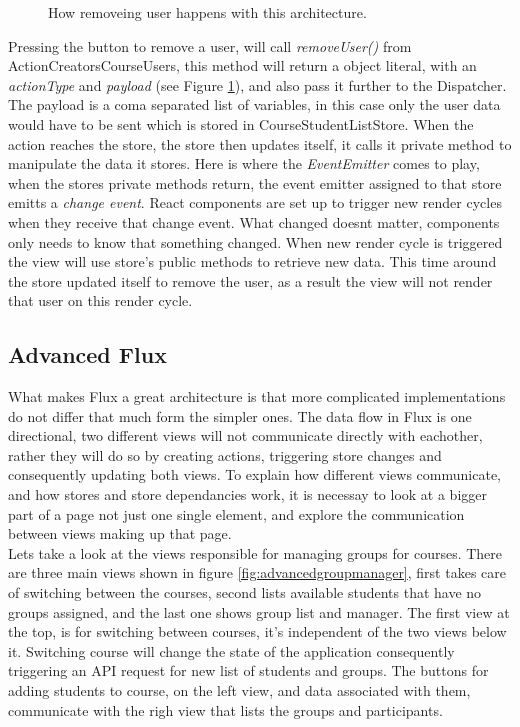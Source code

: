 \begin{figure}[h]
  \scalebox{0.8}{}
  \caption{How removeing user happens with this architecture.}
  \label{fig:simplefluxremoveuser}
\end{figure}

Pressing the button to remove a user, will call \emph{removeUser()} from ActionCreatorsCourseUsers, this method will return a object literal, with an \emph{actionType} and \emph{payload} (see Figure \ref{fig:simplefluxremoveuser}), and also pass it further to the Dispatcher. The payload is a coma separated list of variables, in this case only the user data would have to be sent which is stored in CourseStudentListStore. When the action reaches the store, the store then updates itself, it calls it private method to manipulate the data it stores. Here is where the \emph{EventEmitter} comes to play, when the stores private methods return, the event emitter assigned to that store emitts a \emph{change event}. React components are set up to trigger new render cycles when they receive that change event. What changed doesnt matter, components only needs to know that something changed. When new render cycle is triggered the view will use store's public methods to retrieve new data. This time around the store updated itself to remove the user, as a result the view will not render that user on this render cycle.

\subsection{Advanced Flux}\label{sec:advancedfluxexample}
What makes Flux a great architecture is that more complicated implementations do not differ that much form the simpler ones. The data flow in Flux is one directional, two different views will not communicate directly with eachother, rather they will do so by creating actions, triggering store changes and consequently updating both views. To explain how different views communicate, and how stores and store dependancies work, it is necessay to look at a bigger part of a page not just one single element, and explore the communication between views making up that page.
\\Lets take a look at the views responsible for managing groups for courses. There are three main views shown in figure \ref{fig:advancedgroupmanager}, first takes care of switching between the courses, second lists available students that have no groups assigned, and the last one shows group list and manager. The first view at the top, is for switching between courses, it's independent of the two views below it. Switching course will change the state of the application consequently triggering an API request for new list of students and groups. The buttons for adding students to course, on the left view, and data associated with them, communicate with the righ view that lists the groups and participants.

